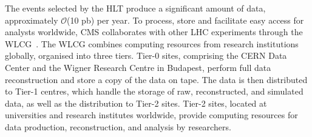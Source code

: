 The events selected by the \ac{HLT} produce a significant amount of data, approximately $\mathcal{O}$(10 pb) per year. 
To process, store and facilitate easy access for analysts worldwide, \ac{CMS} collaborates with other \ac{LHC} experiments through the \ac{WLCG}~\cite{wlcg}. 
The \ac{WLCG} combines computing resources from research institutions globally, organised into three tiers. 
Tier-0 sites, comprising the \ac{CERN} Data Center and the Wigner Research Centre in Budapest, perform full data reconstruction and store a copy of the data on tape. 
The data is then distributed to Tier-1 centres, which handle the storage of raw, reconstructed, and simulated data, as well as the distribution to Tier-2 sites. 
Tier-2 sites, located at universities and research institutes worldwide, provide computing resources for data production, reconstruction, and analysis by researchers.
